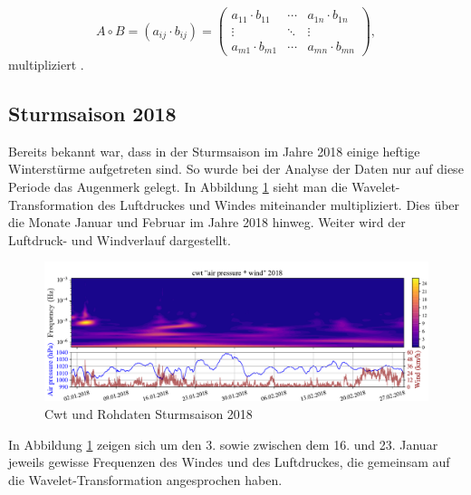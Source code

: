 \begin{refsection}
\begin{equation}
	A\circ B=(a_{{ij}}\cdot b_{{ij}})={\begin{pmatrix}a_{{11}}\cdot b_{{11}}&\cdots &a_{{1n}}\cdot b_{{1n}}\\\vdots &\ddots &\vdots \\a_{{m1}}\cdot b_{{m1}}&\cdots &a_{{mn}}\cdot b_{{mn}}\end{pmatrix}},
\end{equation}
multipliziert \cite{online:schur}.




\subsection{Sturmsaison 2018}
Bereits bekannt war, dass in der Sturmsaison im Jahre 2018 einige heftige Winterstürme aufgetreten sind.
So wurde bei der Analyse der Daten nur auf diese Periode das Augenmerk gelegt. 
In Abbildung \ref{fig:cwt_storm} \space sieht man die Wavelet-Transformation des Luftdruckes und Windes miteinander multipliziert.
Dies über die Monate Januar und Februar im Jahre 2018 hinweg.
Weiter wird der Luftdruck- und Windverlauf dargestellt.
 
\begin{figure}[]
	\centering
	\includegraphics[width=1\textwidth]{papers/wwt/images/storm_airp_wind.pdf}
	\caption{Cwt und Rohdaten Sturmsaison 2018}
	\label{fig:cwt_storm}
\end{figure}

In Abbildung \ref{fig:cwt_storm} \space zeigen sich um den 3. sowie zwischen dem 16. und 23. Januar jeweils gewisse Frequenzen des Windes und des Luftdruckes, die gemeinsam auf die Wavelet-Transformation angesprochen haben.


\end{refsection}
